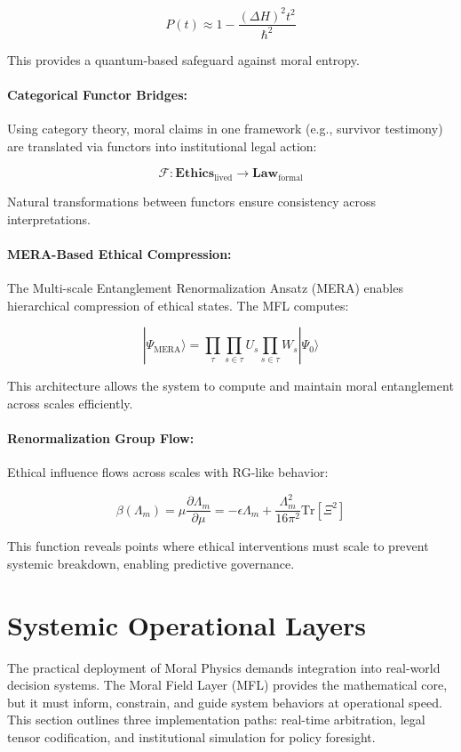 \documentclass{article}
\theoremstyle{plain}
\theoremstyle{claimstyle}
\begin{document}
\[
P(t) \approx 1 - \frac{(\Delta H)^2 t^2}{\hbar^2}
\]

This provides a quantum-based safeguard against moral entropy.

\paragraph{Categorical Functor Bridges:}

Using category theory, moral claims in one framework (e.g., survivor testimony) are translated via functors into institutional legal action:

\[
\mathcal{F}: \mathbf{Ethics}_{\text{lived}} \rightarrow \mathbf{Law}_{\text{formal}}
\]

Natural transformations between functors ensure consistency across interpretations.

\paragraph{MERA-Based Ethical Compression:}

The Multi-scale Entanglement Renormalization Ansatz (MERA) enables hierarchical compression of ethical states. The MFL computes:

\[
|\Psi_{\text{MERA}}\rangle = \prod_{\tau}\prod_{s\in\tau}U_s \prod_{s\in\tau}W_s|\Psi_0\rangle
\]

This architecture allows the system to compute and maintain moral entanglement across scales efficiently.

\paragraph{Renormalization Group Flow:}

Ethical influence flows across scales with RG-like behavior:

\[
\beta(\Lambda_m) = \mu \frac{\partial \Lambda_m}{\partial \mu} = -\epsilon \Lambda_m + \frac{\Lambda_m^2}{16\pi^2} \text{Tr}[\Xi^2]
\]

This function reveals points where ethical interventions must scale to prevent systemic breakdown, enabling predictive governance.

\section{Systemic Operational Layers}

The practical deployment of Moral Physics demands integration into real-world decision systems. The Moral Field Layer (MFL) provides the mathematical core, but it must inform, constrain, and guide system behaviors at operational speed. This section outlines three implementation paths: real-time arbitration, legal tensor codification, and institutional simulation for policy foresight.
\end{document}
